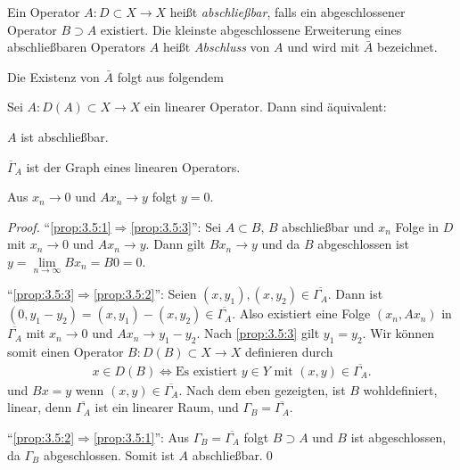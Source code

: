 \begin{defn*}
Ein Operator $A : D \subset X \to X$ heißt
\emph{abschließbar}, falls ein abgeschlossener
Operator $B \supset A$ existiert.
Die kleinste abgeschlossene Erweiterung eines abschließbaren
Operators $A$ heißt \emph{Abschluss} von $A$ und wird
mit $\bar{A}$ bezeichnet.
\end{defn*}

Die Existenz von $\bar{A}$ folgt aus folgendem

\begin{prop}
\label{prop:3.5}
Sei $A : D(A) \subset X \to X$ ein linearer Operator.
Dann sind äquivalent:
\begin{equivenum}
\item\label{prop:3.5:1} $A$ ist abschließbar.
\item\label{prop:3.5:2} $\overline{\Gamma}_A$ ist der Graph eines linearen
Operators.
\item\label{prop:3.5:3} Aus $x_n \to 0$ und $Ax_n \to y$ folgt $y = 0$.\fish
\end{equivenum}
\end{prop}
\begin{proof}
``\ref{prop:3.5:1}$\Rightarrow$\ref{prop:3.5:3}'': Sei $A\subset B$, $B$
abschließbar und $x_n$ Folge in $D$ mit $x_n\to 0$ und $Ax_n\to y$. Dann gilt
$Bx_n \to y$ und da $B$ abgeschlossen ist $y = \lim\limits_{n\to \infty} Bx_n =
B0 = 0$.

``\ref{prop:3.5:3}$\Rightarrow$\ref{prop:3.5:2}'': Seien $(x,y_1),(x,y_2)\in
\overline{\Gamma_A}$. Dann ist $(0,y_1-y_2) = (x,y_1)-(x,y_2)\in
\overline{\Gamma_A}$. Also existiert eine Folge $(x_n,Ax_n)$ in
$\overline{\Gamma_A}$ mit $x_n\to 0$ und $Ax_n\to y_1-y_2$. Nach
\ref{prop:3.5:3} gilt $y_1=y_2$. Wir können somit einen Operator $B:D(B)\subset
X\to X$ definieren durch
\begin{align*}
x\in D(B) \Leftrightarrow \text{Es existiert }y\in Y\text{ mit }(x,y)\in
\overline{\Gamma_A}.
\end{align*}
und $Bx=y$ wenn $(x,y)\in \overline{\Gamma_A}$. Nach dem eben gezeigten, ist $B$
wohldefiniert, linear, denn $\overline{\Gamma_A}$ ist ein linearer Raum, und
$\Gamma_B = \overline{\Gamma_A}$.

``\ref{prop:3.5:2}$\Rightarrow$\ref{prop:3.5:1}'': Aus
$\Gamma_B=\overline{\Gamma_A}$ folgt $B\supset A$ und $B$ ist abgeschlossen, da
$\Gamma_B$ abgeschlossen. Somit ist $A$ abschließbar.\qed
\end{proof}


